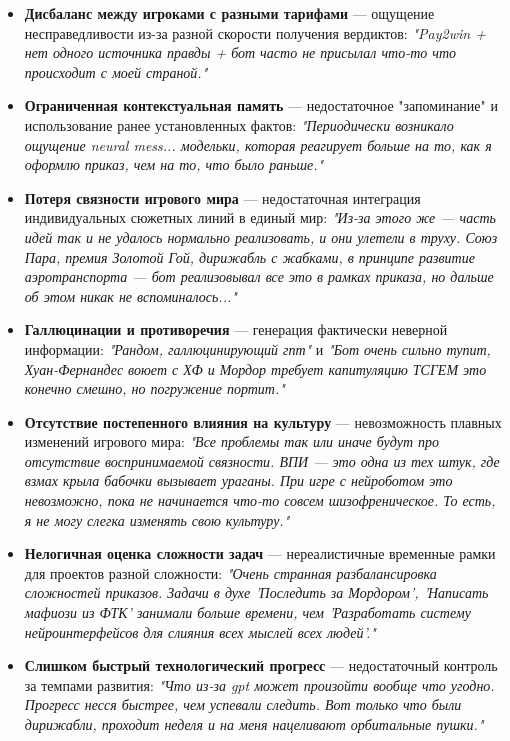 \begin{itemize}
    \item \textbf{Дисбаланс между игроками с разными тарифами} — ощущение несправедливости из-за разной скорости получения вердиктов: \textit{"{}Pay2win + нет одного источника правды + бот часто не присылал что-то что происходит с моей страной."{}}

    \item \textbf{Ограниченная контекстуальная память} — недостаточное "{}запоминание"{} и использование ранее установленных фактов: \textit{"{}Периодически возникало ощущение neural mess... модельки, которая реагирует больше на то, как я оформлю приказ, чем на то, что было раньше."{}}

    \item \textbf{Потеря связности игрового мира} — недостаточная интеграция индивидуальных сюжетных линий в единый мир: \textit{"{}Из-за этого же — часть идей так и не удалось нормально реализовать, и они улетели в труху. Союз Пара, премия Золотой Гой, дирижабль с жабками, в принципе развитие аэротранспорта — бот реализовывал все это в рамках приказа, но дальше об этом никак не вспоминалось..."{}}

    \item \textbf{Галлюцинации и противоречия} — генерация фактически неверной информации: \textit{"{}Рандом, галлюцинирующий гпт"{}} и \textit{"{}Бот очень сильно тупит, Хуан-Фернандес воюет с ХФ и Мордор требует капитуляцию ТСГЕМ это конечно смешно, но погружение портит."{}}

    \item \textbf{Отсутствие постепенного влияния на культуру} — невозможность плавных изменений игрового мира: \textit{"{}Все проблемы так или иначе будут про отсутствие воспринимаемой связности. ВПИ — это одна из тех штук, где взмах крыла бабочки вызывает ураганы. При игре с нейроботом это невозможно, пока не начинается что-то совсем шизофреническое. То есть, я не могу слегка изменять свою культуру."{}}

    \item \textbf{Нелогичная оценка сложности задач} — нереалистичные временные рамки для проектов разной сложности: \textit{"{}Очень странная разбалансировка сложностей приказов. Задачи в духе 'Последить за Мордором', 'Написать мафиози из ФТК' занимали больше времени, чем 'Разработать систему нейроинтерфейсов для слияния всех мыслей всех людей'."{}}

    \item \textbf{Слишком быстрый технологический прогресс} — недостаточный контроль за темпами развития: \textit{"{}Что из-за gpt может произойти вообще что угодно. Прогресс несся быстрее, чем успевали следить. Вот только что были дирижабли, проходит неделя и на меня нацеливают орбитальные пушки."{}}
\end{itemize}

